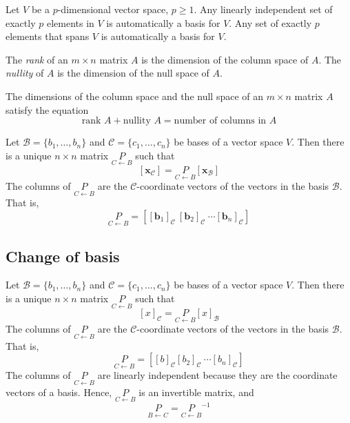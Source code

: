 \documentclass{article}
\begin{document}
\begin{thm} 
    Let \(V\) be a \(p\)-dimensional vector space, \(p\geq1\). Any linearly independent set of exactly \(p\) elements in \(V\) is automatically a basis for \(V\). Any set of exactly \(p\) elements that spans \(V\) is automatically a basis for \(V\).
\end{thm}

\begin{defn}
    The \emph{rank} of an \(m\times n\) matrix \(A\) is the dimension of the column space of \(A\). The \emph{nullity} of \(A\) is the dimension of the null space of \(A\).
\end{defn}

\begin{thm} 
    The dimensions of the column space and the null space of an \(m\times n\) matrix \(A\) satisfy the equation \[\text{rank }A+\text{nullity }A=\text{number of columns in }A\] 
\end{thm}

\begin{thm}
    Let \(\mathcal{B}=\{b_1,\ldots,b_n\}\) and \(\mathcal{C}=\{c_1,\ldots,c_n\}\) be bases of a vector space \(V\). Then there is a unique \(n\times n\) matrix \(\underset{C\leftarrow B}{P}\) such that \[\left[\textbf{x}_\mathcal{C}\right]=\underset{C\leftarrow B}{P}\left[\textbf{x}_\mathcal{B}\right]\] The columns of \(\underset{C \leftarrow B}{P}\) are the \(\mathcal{C}\)-coordinate vectors of the vectors in the basis \(\mathcal{B}\). That is, \[\underset{C\leftarrow B}{P}=\left[\left[\textbf{b}_1\right]_\mathcal{C}\ \left[\textbf{b}_2\right]_\mathcal{C}\ \cdots \left[\textbf{b}_n\right]_\mathcal{C}\right]\]
\end{thm}

\subsection{Change of basis}

\begin{thm}
    Let \(\mathcal{B}=\{b_1,\ldots,b_n\}\) and \(\mathcal{C}=\{c_1,\ldots,c_n\}\) be bases of a vector space \(V\). Then there is a unique \(n\times n\) matrix \(\underset{C\leftarrow B}{P}\) such that \[\left[x\right]_\mathcal{C}=\underset{C\leftarrow B}{P}\left[x\right]_\mathcal{B}\] The columns of \(\underset{C\leftarrow B}{P}\) are the \(\mathcal{C}\)-coordinate vectors of the vectors in the basis \(\mathcal{B}\). That is, \[\underset{C\leftarrow B}{P}=\left[\left[b\right]_\mathcal{C} \left[b_2\right]_\mathcal{C}\ \cdots \left[b_n\right]_\mathcal{C}\right]\]
    The columns of \(\underset{C\leftarrow B}{P}\) are linearly independent because they are the coordinate vectors of a basis. Hence, \(\underset{C\leftarrow B}{P}\) is an invertible matrix, and \[\underset{B\leftarrow C}{P}=\underset{C\leftarrow B}{P}^{-1}\]
\end{thm}
\end{document}
